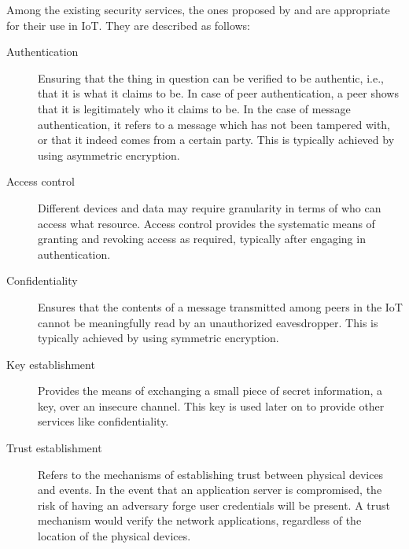 \documentclass[12pt]{article}
\begin{document}
Among the existing security services, the ones proposed by \citet{HELLAOUI2017173} and \citet{ALABA201710} are appropriate for their use in IoT. They are described as follows: 

\begin{description}
\item [Authentication] Ensuring that the thing in question can be verified to be authentic, i.e., that it is what it claims to be. In case of peer authentication, a peer shows that it is legitimately who it claims to be. In the case of message authentication, it refers to a message which has not been tampered with, or that it indeed comes from a certain party. This is typically achieved by using asymmetric encryption.
\item [Access control] Different devices and data may require granularity in terms of who can access what resource. Access control provides the systematic means of granting and revoking access as required, typically after engaging in authentication.
\item [Confidentiality] Ensures that the contents of a message transmitted among peers in the IoT cannot be meaningfully read by an unauthorized eavesdropper. This is typically achieved by using symmetric encryption.
\item [Key establishment] Provides the means of exchanging a small piece of secret information, a key, over an insecure channel. This key is used later on to provide other services like confidentiality.
\item [Trust establishment] Refers to the mechanisms of establishing trust between physical devices and events. In the event that an application server is compromised, the risk of having an adversary forge user credentials will be present. A trust mechanism would verify the network applications, regardless of the location of the physical devices. 
\end{description}
\end{document}
